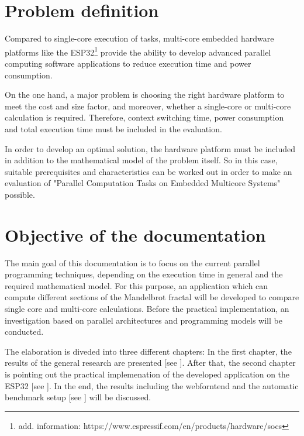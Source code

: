 \section{Problem definition}

Compared to single-core execution of tasks, multi-core embedded hardware platforms like the ESP32\footnote{add. information: https://www.espressif.com/en/products/hardware/socs} provide the ability to develop advanced parallel computing software applications to reduce execution time and power consumption.

On the one hand, a major problem is choosing the right hardware platform to meet the cost and size factor, and moreover, whether a single-core or multi-core calculation is required. Therefore, context switching time, power consumption and total execution time must be included in the evaluation.

In order to develop an optimal solution, the hardware platform must be included in addition to the mathematical model of the problem itself. So in this case, suitable prerequisites and characteristics can be worked out in order to make an evaluation of "Parallel Computation Tasks on Embedded Multicore Systems" possible.

\section{Objective of the documentation}

The main goal of this documentation is to focus on the current parallel programming techniques, depending on the execution time in general and the required mathematical model. For this purpose, an application which can compute different sections of the Mandelbrot fractal \parencite[see][p11]{article18} will be developed to compare single core and multi-core calculations. Before the practical implementation, an investigation based on parallel architectures and programming models will be conducted.

The elaboration is diveded into three different chapters: In the first chapter, the results of the general research are presented [see ]. After that, the second chapter is pointing out the practical implemenation of the developed application on the ESP32 [see ]. In the end, the results including the webforntend and the automatic benchmark setup [see ] will be discussed.